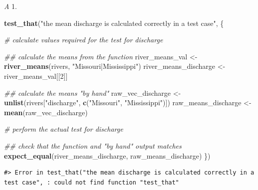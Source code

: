 \documentclass[
]{book}
\newenvironment{Shaded}{\begin{snugshade}}{\end{snugshade}}
\newcommand{\CommentTok}[1]{\textcolor[rgb]{0.56,0.35,0.01}{\textit{#1}}}
\newcommand{\DecValTok}[1]{\textcolor[rgb]{0.00,0.00,0.81}{#1}}
\newcommand{\KeywordTok}[1]{\textcolor[rgb]{0.13,0.29,0.53}{\textbf{#1}}}
\newcommand{\NormalTok}[1]{#1}
\newcommand{\StringTok}[1]{\textcolor[rgb]{0.31,0.60,0.02}{#1}}
\begin{document}
\emph{A} 1.

\begin{Shaded}
\begin{Highlighting}[]
\KeywordTok{test_that}\NormalTok{(}\StringTok{"the mean discharge is calculated correctly in a test case"}\NormalTok{, \{}
  
  \CommentTok{# calculate values required for the test for discharge}

  \CommentTok{## calculate the means from the function}
\NormalTok{  river_means_val <-}\StringTok{ }\KeywordTok{river_means}\NormalTok{(rivers, }\StringTok{"Missouri|Mississippi"}\NormalTok{)}
\NormalTok{  river_means_discharge <-}\StringTok{ }\NormalTok{river_means_val[[}\DecValTok{2}\NormalTok{]]}

  \CommentTok{## calculate the means "by hand"}
\NormalTok{  raw_vec_discharge <-}\StringTok{ }\KeywordTok{unlist}\NormalTok{(rivers[}\StringTok{"discharge"}\NormalTok{, }\KeywordTok{c}\NormalTok{(}\StringTok{"Missouri"}\NormalTok{, }\StringTok{"Mississippi"}\NormalTok{)])}
\NormalTok{  raw_means_discharge <-}\StringTok{ }\KeywordTok{mean}\NormalTok{(raw_vec_discharge)}
  
  \CommentTok{# perform the actual test for discharge}

  \CommentTok{## check that the function and "by hand" output matches}
  \KeywordTok{expect_equal}\NormalTok{(river_means_discharge, raw_means_discharge)}
\NormalTok{\})}
\end{Highlighting}
\end{Shaded}

\begin{verbatim}
#> Error in test_that("the mean discharge is calculated correctly in a test case", : could not find function "test_that"
\end{verbatim}
\end{document}
